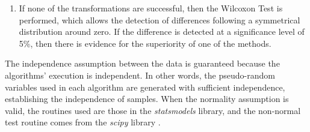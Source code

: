 \begin{enumerate}
				\item If none of the transformations are successful, then the Wilcoxon Test is performed, which allows the detection of differences following a symmetrical distribution around zero. If the difference is detected at a significance level of 5\%, then there is evidence for the superiority of one of the methods.
			\end{enumerate}
			The independence assumption between the data is guaranteed because the algorithms’ execution is independent. In other words, the pseudo-random variables used in each algorithm are generated with sufficient independence, establishing the independence of samples. When the normality assumption is valid, the routines used are those in the \textit{statsmodels} library, and the non-normal test routine comes from the \textit{scipy} library \citep{scipy}.
			
